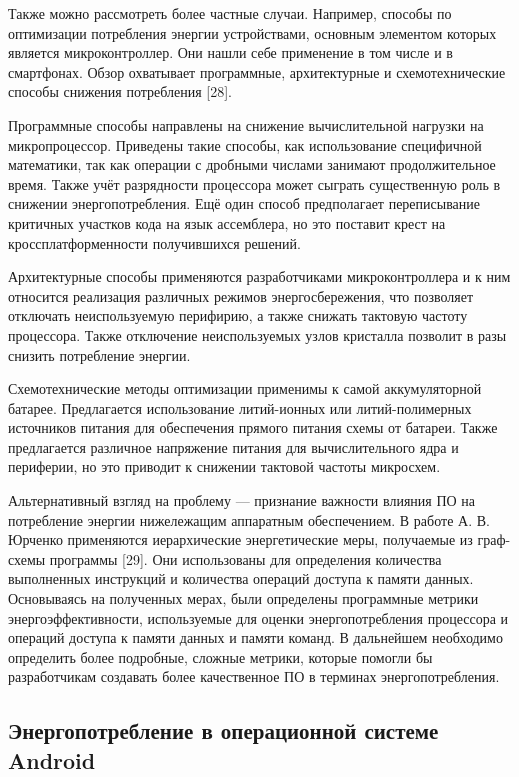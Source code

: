 \documentclass[a4paper,14pt]{extarticle} %
\begin{document}
	Также можно рассмотреть более частные случаи. Например, способы по оптимизации потребления энергии устройствами, основным элементом которых является микроконтроллер. Они нашли себе применение в том числе и в смартфонах. Обзор охватывает программные, архитектурные и схемотехнические способы снижения потребления [28].
	
	Программные способы направлены на снижение вычислительной нагрузки на микропроцессор. Приведены такие способы, как использование специфичной математики, так как операции с дробными числами занимают продолжительное время. Также учёт разрядности процессора может сыграть существенную роль в снижении энергопотребления. Ещё один способ предполагает переписывание критичных участков кода на язык ассемблера, но это поставит крест на кроссплатформенности получившихся решений.
	
	Архитектурные способы применяются разработчиками микроконтроллера и к ним относится реализация различных режимов энергосбережения, что позволяет отключать неиспользуемую перифирию, а также снижать тактовую частоту процессора. Также отключение неиспользуемых узлов кристалла позволит в разы снизить потребление энергии.
	
	Схемотехнические методы оптимизации применимы к самой аккумуляторной батарее. Предлагается использование литий-ионных или литий-полимерных источников питания для обеспечения прямого питания схемы от батареи. Также предлагается различное напряжение питания для вычислительного ядра и периферии, но это приводит к снижении тактовой частоты микросхем.
	
	Альтернативный взгляд на проблему — признание важности влияния ПО на потребление энергии нижележащим аппаратным обеспечением. В работе А. В. Юрченко применяются иерархические энергетические меры, получаемые из граф-схемы программы [29]. Они использованы для определения количества выполненных инструкций и количества операций доступа к памяти данных. Основываясь на полученных мерах, были определены программные метрики энергоэффективности, используемые для оценки энергопотребления процессора и операций доступа к памяти данных и памяти команд. В дальнейшем необходимо определить более подробные, сложные метрики, которые помогли бы разработчикам создавать более качественное ПО в терминах энергопотребления.
	
	\subsection{Энергопотребление в операционной системе Android}
\end{document}
